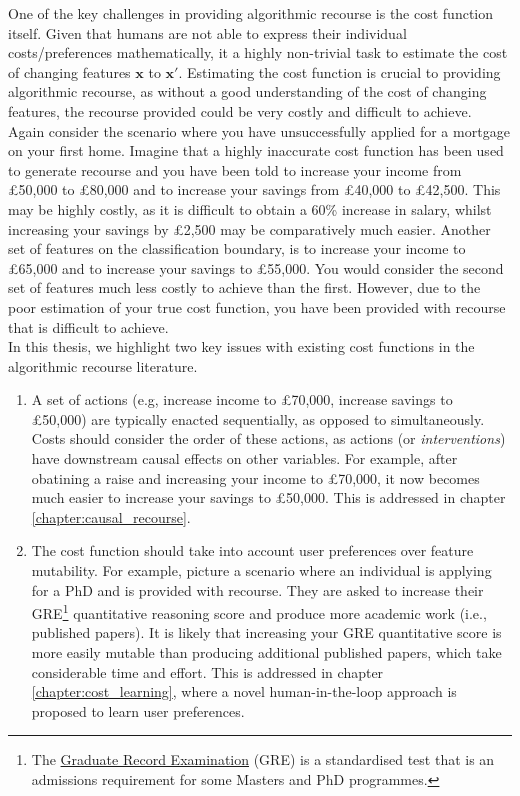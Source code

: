 One of the key challenges in providing algorithmic recourse is the cost function itself. Given that humans are not able to express their individual costs/preferences mathematically, it a highly non-trivial task to estimate the cost of changing features $\boldsymbol{x}$ to  $\boldsymbol{x}'$. Estimating the cost function is crucial to providing algorithmic recourse, as without a good understanding of the cost of changing features, the recourse provided could be very costly and difficult to achieve. Again consider the scenario where you have unsuccessfully applied for a mortgage on your first home. Imagine that a highly inaccurate cost function has been used to generate recourse and you have been told to increase your income from £50,000 to £80,000 and to increase your savings from £40,000 to £42,500. This may be highly costly, as it is difficult to obtain a 60\% increase in salary, whilst increasing your savings by £2,500 may be comparatively much easier. Another set of features on the classification boundary, is to increase your income to £65,000 and to increase your savings to £55,000. You would consider the second set of features much less costly to achieve than the first. However, due to the poor estimation of your true cost function, you have been provided with recourse that is difficult to achieve.\\

In this thesis, we highlight two key issues with existing cost functions in the algorithmic recourse literature.

\begin{enumerate}
	\item A set of actions (e.g, increase income to £70,000, increase savings to £50,000) are typically enacted sequentially, as opposed to simultaneously. Costs should consider the order of these actions, as actions (or \textit{interventions}) have downstream causal effects on other variables. For example, after obatining a raise and increasing your income to £70,000, it now becomes much easier to increase your savings to £50,000. This is addressed in chapter \ref{chapter:causal_recourse}.
	
	\item The cost function should take into account user preferences over feature mutability. For example, picture a scenario where an individual is applying for a PhD and is provided with recourse. They are asked to increase their GRE\footnote{The \href{https://www.ets.org/gre.html}{Graduate Record Examination} (GRE) is a standardised test that is an admissions requirement for some Masters and PhD programmes.} quantitative reasoning score and produce more academic work (i.e., published papers). It is likely that increasing your GRE quantitative score is more easily mutable than producing additional published papers, which take considerable time and effort. This is addressed in chapter \ref{chapter:cost_learning}, where a novel human-in-the-loop approach is proposed to learn user preferences.
\end{enumerate}



